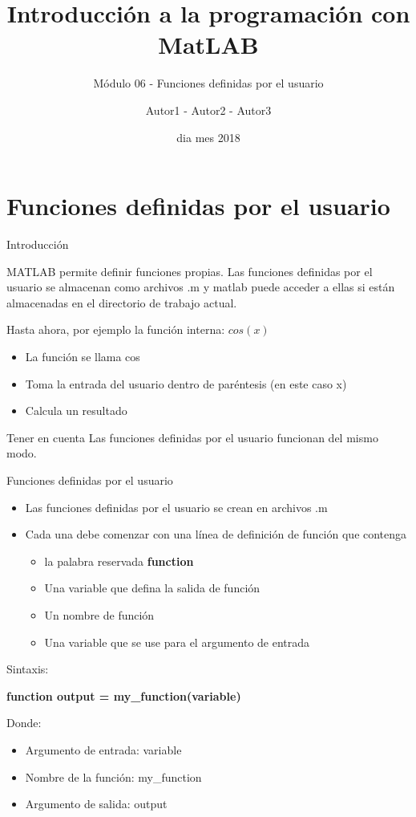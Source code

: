 \documentclass{bredelebeamer}
\title[Programación en MatLAB]{Introducción a la programación con MatLAB}
\subtitle{Módulo 06 - Funciones definidas por el usuario}
\author{Autor1 - Autor2 - Autor3\inst{1}}
\institute[UTN.BA]
{
  \inst{1}%
  Universidad Tecnológica Nacional\\
  Facultad Regional Buenos Aires
  }
\date{dia mes 2018}
\begin{document}
\begin{frame}
  \titlepage 
\end{frame}




\section{Funciones definidas por el usuario}

\begin{frame}{Introducción}
\begin{center}
MATLAB permite definir funciones propias. Las funciones definidas por el usuario se almacenan como archivos .m y matlab puede acceder a ellas si están almacenadas en el directorio de trabajo actual.
\end{center}
Hasta ahora, por ejemplo la función interna: $cos(x)$
\begin{itemize}
\item La función se llama cos
\item Toma la entrada del usuario dentro de paréntesis (en este caso x)
\item Calcula un resultado\\
\end{itemize}
\begin{block}{Tener en cuenta}
Las funciones definidas por el usuario funcionan del mismo modo.
\end{block}
\end{frame}

\begin{frame}{Funciones definidas por el usuario}
\begin{itemize}
\item Las funciones definidas por el usuario se crean en archivos .m
\item Cada una debe comenzar con una línea de definición de función que contenga
\begin{itemize}
\item la palabra reservada \textbf{function}
\item Una variable que defina la salida de función
\item Un nombre de función
\item Una variable que se use para el argumento de entrada
\end{itemize}
\end{itemize}
Sintaxis:
\begin{center}
\textbf{function output = my\_function(variable)}
\end{center}
Donde:
\begin{itemize}
\item Argumento de entrada: variable
\item Nombre de la función: my\_function
\item Argumento de salida: output
\end{itemize}
\end{frame}
\end{document}
